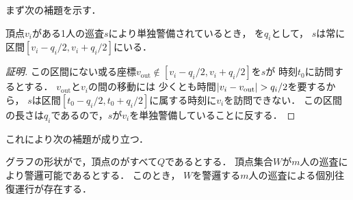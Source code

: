 まず次の補題を示す．

\begin{lemm}
  \label{lemm:RangeOfPatrollerOnLine}
  頂点$v_i$がある1人の巡査$s$により単独警備されているとき，
  {\idletime}を$q_i$として，
  $s$は常に区間$[v_i - q_i/2, v_i + q_i/2]$にいる．
\end{lemm}

\begin{proof}[証明]
  \newcommand{\vout}{v_{\mathrm{out}}}
  この区間にない或る座標$\vout \notin [v_i - q_i/2, v_i + q_i/2]$を$s$が
  時刻$t_0$に訪問するとする．
  $\vout$と$v_i$の間の移動には
  少くとも時間$\abs{v_i - \vout} > q _i / 2$を要するから，
  $s$は区間$[t_0 - q _i / 2, t_0 + q _i / 2]$に属する時刻に$v_i$を訪問できない．
  この区間の長さは$
    q_i
  $であるので，$s$が$v _i$を単独警備していることに反する．
\end{proof}



これにより次の補題が成り立つ．


\begin{lemm}
 \label{lemm:LineEqualTimelimitIndependentInterval}
  グラフの形状が{\graphLine}で，頂点の{\idletime}がすべて$Q$であるとする．
  頂点集合$W$が$m$人の巡査により警邏可能であるとする．
  このとき，
  $W$を警邏する$m$人の巡査による個別往復運行が存在する．
\end{lemm}


